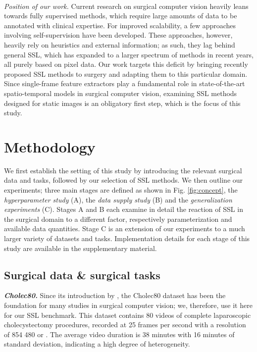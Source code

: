 \documentclass[times,twocolumn,final]{elsarticle}
\begin{document}
\\
\noindent\textit{Position of our work. } Current research on surgical computer vision heavily leans towards fully supervised methods, which require large amounts of data to be annotated with clinical expertise. For improved scalability, a few approaches involving self-supervision have been developed. These approaches, however, heavily rely on heuristics and external information; as such, they lag behind general SSL, which has expanded to a larger spectrum of methods in recent years, all purely based on pixel data. Our work targets this deficit by bringing recently proposed SSL methods to surgery and adapting them to this particular domain. Since single-frame feature extractors play a fundamental role in state-of-the-art spatio-temporal models in surgical computer vision, examining SSL methods designed for static images is an obligatory first step, which is the focus of this study.

\section{Methodology}

We first establish the setting of this study by introducing the relevant surgical data and tasks, followed by our selection of SSL methods. We then outline our experiments; {\color{changetext} three main stages are defined as shown in Fig. \ref{fig:concept}, the \emph{hyperparameter study} (A), the \emph{data supply study} (B) and the \emph{generalization experiments} (C). Stages A and B each examine in detail the reaction of SSL in the surgical domain to a different factor, respectively parameterization and available data quantities. Stage C is an extension of our experiments to a much larger variety of datasets and tasks.} Implementation details for each stage of this study are available in the supplementary material.

\subsection{Surgical data \& surgical tasks}

\noindent\textit{\textbf{Cholec80. }} Since its introduction by \cite{twinanda2016endonet}, the Cholec80 dataset has been the foundation for many studies in surgical computer vision; we, therefore, use it here for our SSL benchmark. This dataset contains 80 videos of complete laparoscopic cholecystectomy procedures, recorded at 25 frames per second with a resolution of 854  480 \textcolor{newtext}{or }. The average video duration is 38 minutes with 16 minutes of standard deviation, indicating a high degree of heterogeneity.
\end{document}
